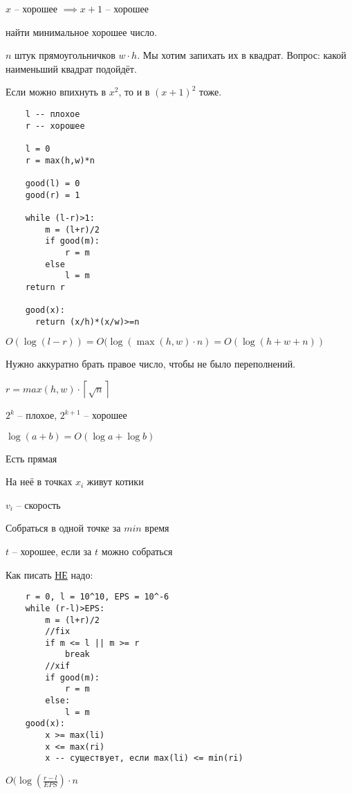 \documentclass{book}
\theoremstyle{definition}
\begin{document}
$x$ -- хорошее $\implies x+1$ -- хорошее

\begin{problem}
    найти минимальное хорошее число.
\end{problem}

$n$ штук прямоугольничков  $w\cdot h$. Мы хотим запихать их в квадрат. Вопрос: какой наименьший квадрат подойдёт.

Если можно впихнуть в $x^2$, то и в $(x+1)^2$ тоже.

\begin{verbatim}
    l -- плохое
    r -- хорошее

    l = 0
    r = max(h,w)*n

    good(l) = 0
    good(r) = 1

    while (l-r)>1:
        m = (l+r)/2
        if good(m):
            r = m
        else
            l = m
    return r
    
    good(x):
      return (x/h)*(x/w)>=n
\end{verbatim}
$O(\log (l-r)) = O(\log \left( \max(h,w) \cdot  n \right) = O(\log (h+w+n))$

Нужно аккуратно брать правое число, чтобы не было переполнений.

$r = max(h,w)\cdot \left\lceil \sqrt{n}  \right\rceil $

$2^k$ -- плохое, $2^{k+1}$ -- хорошее

$\log (a+b) = O(\log  a + \log b)$

\begin{problem}
    Есть прямая 

    На неё в точках $x_i$ живут котики

    $v_i$ -- скорость

    Собраться в одной точке за  $min$ время

     $t$ -- хорошее, если за  $t$ можно собраться
\end{problem}

Как писать \underline{НЕ} надо:
\begin{verbatim}
    r = 0, l = 10^10, EPS = 10^-6
    while (r-l)>EPS:
        m = (l+r)/2
        //fix
        if m <= l || m >= r
            break
        //xif
        if good(m):
            r = m
        else:
            l = m
    good(x):
        x >= max(li)
        x <= max(ri)
        x -- существует, если max(li) <= min(ri)
\end{verbatim}

$O(\log \left( \frac{r-l}{EPS} \right) \cdot n$
\end{document}

